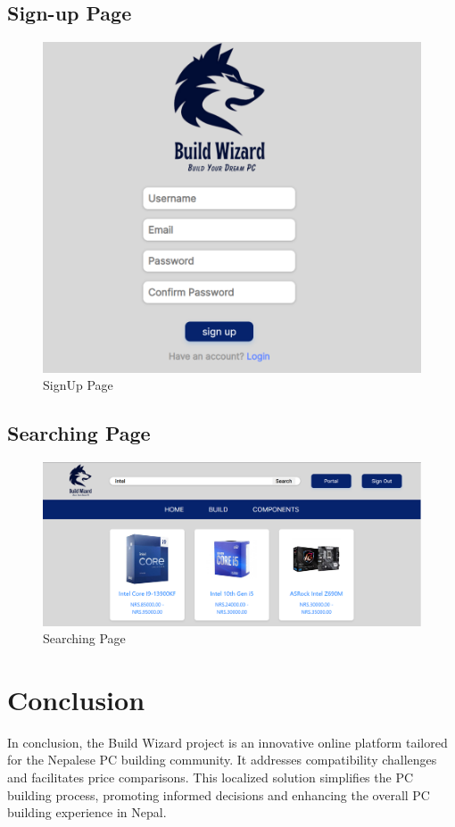 \subsection{Sign-up Page}
\begin{figure}[H]
    \includegraphics[width=16cm]{Diagrams/UISIGNUP.png}
    \caption{SignUp Page}
    \end{figure}
    \subsection{Searching Page}
\begin{figure}[H]
    \includegraphics[width=16cm]{Diagrams/searching.png}
    \caption{Searching Page}
    \end{figure}
\section{Conclusion}
In conclusion, the Build Wizard project is an innovative online platform tailored for the Nepalese PC building community. It addresses compatibility challenges and facilitates price comparisons. This localized solution simplifies the PC building process, promoting informed decisions and enhancing the overall PC building experience in Nepal.
